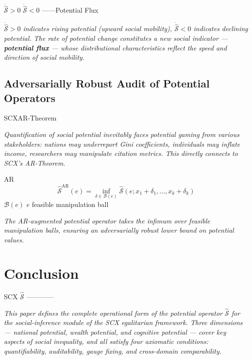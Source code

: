 \documentclass[11pt,a4paper]{article}
\theoremstyle{definition}
\newcommand{\Sop}{\hat{\mathcal{S}}}
\begin{document}
\noindent $\dot{\Sop} > 0$ $\dot{\Sop} < 0$ 
——\textbf{}Potential Flux


\medskip
\noindent\textit{$\dot{\Sop} > 0$ indicates rising potential (upward social mobility), $\dot{\Sop} < 0$ indicates declining potential. The rate of potential change constitutes a new social indicator — \textbf{potential flux} — whose distributional characteristics reflect the speed and direction of social mobility.}

\subsection{ Adversarially Robust Audit of Potential Operators}

\textit{}

SCXAR-Theorem

\medskip
\noindent\textit{Quantification of social potential inevitably faces \textit{potential gaming} from various stakeholders: nations may underreport Gini coefficients, individuals may inflate income, researchers may manipulate citation metrics. This directly connects to SCX's AR-Theorem.}

\bigskip
AR
\begin{equation}
    \Sop^{\text{AR}}(e) = \inf_{\delta \in \mathcal{B}(e)} \Sop(e; x_1 + \delta_1, \ldots, x_k + \delta_k)
\end{equation}
 $\mathcal{B}(e)$  $e$ feasible manipulation ball


\medskip
\noindent\textit{The AR-augmented potential operator takes the infimum over feasible manipulation balls, ensuring an adversarially robust lower bound on potential values.}

\section{ Conclusion}

SCX $\Sop$ 
————


\medskip
\noindent\textit{This paper defines the complete operational form of the potential operator $\Sop$ for the social-inference module of the SCX egalitarian framework. Three dimensions — national potential, wealth potential, and cognitive potential — cover key aspects of social inequality, and all satisfy four axiomatic conditions: quantifiability, auditability, gauge fixing, and cross-domain comparability.}
\end{document}
